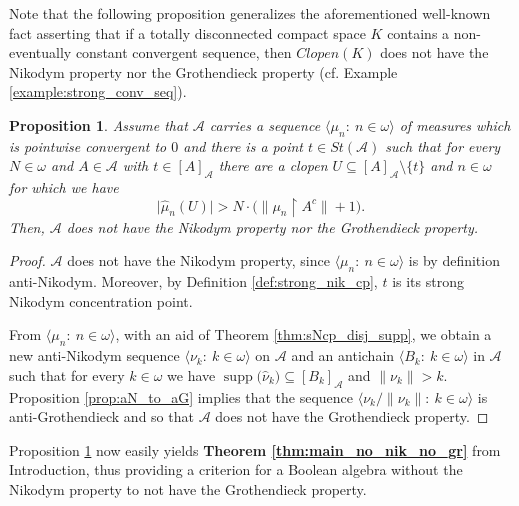 \documentclass[a4paper,11pt,fleqn]{amsart}
\newtheorem{theorem}{Theorem}[section]
\newtheorem{lemma}[theorem]{Lemma}
\newtheorem{proposition}[theorem]{Proposition}
\theoremstyle{definition}
\theoremstyle{remark}
\numberwithin{equation}{section}
\newcommand{\N}{\mathbb{N}}
\newcommand{\aA}{\mathcal{A}}
\newcommand{\rstr}{\restriction}
\newcommand{\sm}{\setminus}
\newcommand{\sub}{\subseteq}
\DeclareMathOperator{\supp}{supp}
\newcommand{\wh}{\widehat}
\newcommand{\seqn}[1]{\big\langle#1\colon\ n\io\big\rangle}
\newcommand{\seqk}[1]{\big\langle#1\colon\ k\io\big\rangle}
\newcommand{\clopen}[1]{\left[#1\right]}
\newcommand{\iA}{\in\aA}
\newcommand{\io}{\in\omega}%
\begin{document}
Note that the following proposition generalizes the aforementioned well-known fact asserting that if a totally disconnected compact space $K$ contains a non-eventually constant convergent sequence, then $Clopen(K)$ does not have the Nikodym property nor the Grothendieck property (cf. Example \ref{example:strong_conv_seq}). 

\begin{proposition}\label{prop:no_nik_no_gr}
Assume that $\aA$ carries a sequence $\seqn{\mu_n}$ of measures which is pointwise convergent to $0$ and there is a point $t\in St(\aA)$ such that for every $N\io$ and $A\iA$ with $t\in\clopen{A}_\aA$ there are a clopen $U\sub\clopen{A}_\aA\sm\{t\}$ and $n\io$ for which we have
\[\big|\wh{\mu}_n(U)\big|>N\cdot\Big(\big\|\mu_n\rstr A^c\big\|+1\Big).\]
Then, $\aA$ does not have the Nikodym property nor the Grothendieck property.
\end{proposition}
\begin{proof}
$\aA$ does not have the Nikodym property, since $\seqn{\mu_n}$ is by definition anti-Nikodym. Moreover, by Definition \ref{def:strong_nik_cp}, $t$ is its strong Nikodym concentration point.

From $\seqn{\mu_n}$, with an aid of Theorem \ref{thm:sNcp_disj_supp}, we obtain a new anti-Nikodym sequence $\seqk{\nu_k}$ on $\aA$ and an antichain $\seqk{B_k}$ in $\aA$ such that for every $k\io$ we have $\supp\big(\wh{\nu}_k\big)\sub\clopen{B_k}_\aA$ and $\big\|\nu_k\big\|>k$. Proposition \ref{prop:aN_to_aG} implies that the sequence $\seqk{\nu_k/\big\|\nu_k\big\|}$ is anti-Grothendieck and so that $\aA$ does not have the Grothendieck property.
\end{proof}

Proposition \ref{prop:no_nik_no_gr} now easily yields \textbf{Theorem \ref{thm:main_no_nik_no_gr}} from Introduction, thus providing a criterion for a Boolean algebra without the Nikodym property to not have the Grothendieck property.


%
%
\end{document}
